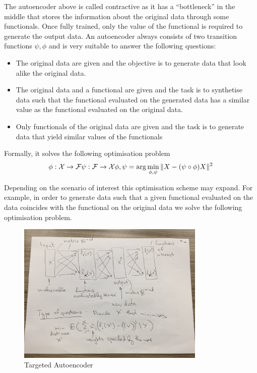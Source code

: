 \documentclass[]{article}
\begin{document}
The autoencoder above is called contractive as it has a ``bottleneck''
in the middle that stores the information about the original data
through some functionals. Once fully trained, only the value of the
functional is required to generate the output data. An autoencoder
always consists of two transition functions \(\psi, \phi\) and is very
suitable to answer the following questions:

\begin{itemize}
\tightlist
\item
  The original data are given and the objective is to generate data that
  look alike the original data.
\item
  The original data and a functional are given and the task is to
  synthetise data such that the functional evaluated on the generated
  data has a similar value as the functional evaluated on the original
  data.
\item
  Only functionals of the original data are given and the task is to
  generate data that yield similar values of the functionals
\end{itemize}

Formally, it solves the following optimisation problem
\[\phi :{\mathcal {X}}\rightarrow {\mathcal {F}} \\
\psi :{\mathcal {F}} \rightarrow {\mathcal {X}} \\
\phi, \psi = \arg\min_{\phi , \psi} \|X -  (\psi \circ \phi) X \|^2\]

Depending on the scenario of interest this optimisation scheme may
expand. For example, in order to generate data such that a given
functional evaluated on the data coincides with the functional on the
original data we solve the following optimisation problem.

\begin{figure}
    \centering
    \includegraphics[width=0.8\textwidth]{uploads/upload_90956042bc74308a6b58ab8792c7593a.JPG}
    \caption{Targeted Autoencoder}
    \label{fig:autoencoder_sketch}
\end{figure}
\end{document}
